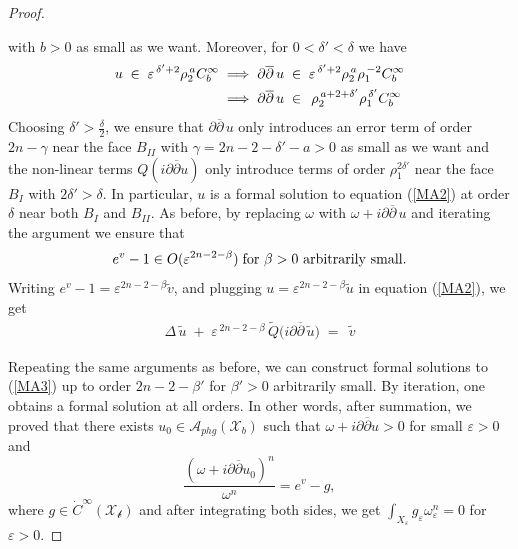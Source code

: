 \documentclass[a4paper,11pt]{article}
\begin{document}
\begin{proof}
\begin{itemize}
with $b>0$ as small as we want.  Moreover, for $0<\delta' < \delta$ we have 
\begin{align*}
u \;\in\; \varepsilon^{\,\delta'+2} \rho_{2}^{\,a} C_{b}^{\infty} 
\hspace{0.1cm} & \Longrightarrow\hspace{0.1cm}
\partial\overline{\partial}\,u
\;\in\;
\varepsilon^{\,\delta'+2}\rho_{2}^{\,a}\rho_{1}^{\,-2} C_{b}^{\infty}\\
& \Longrightarrow\hspace{0.1cm}
\partial\overline{\partial}\,u
\;\in\;
\,\rho_{2}^{\,a +2 + \delta'} \rho_{1}^{\,\delta'} C_{b}^{\infty}
\end{align*}
Choosing $\delta' > \frac{\delta}{2}$, we ensure that $\partial\overline{\partial}\,u$ only introduces an error term of order $2n - \gamma$ near the face $B_{II}$ with $\gamma = 2n-2-\delta' - a > 0$ as small as we want and the non-linear terms $Q(i \partial \overline{\partial} u)$ only introduce terms of order $\rho_1^{2 \delta'}$ near the face $B_{I}$ with $2 \delta' > \delta$. In particular, $u$ is a formal solution to equation (\ref{MA2}) at order $\delta$ near both $B_{I}$ and $B_{II}$. As before, by replacing $\omega$ with $\omega + i \partial\overline{\partial}\,u $ and iterating the argument we ensure that 
$$
e^v -1 \in O(\varepsilon ^{2n - 2 - \beta}) \hspace{0.1cm} \text{for $\beta >0$ arbitrarily small.}
$$ 
Writing $e^v -1 = \varepsilon ^{2n - 2 - \beta} \tilde{v}$, and plugging $u = \varepsilon ^{2n - 2 - \beta} \tilde{u}$ in equation (\ref{MA2}), we get 
\begin{align}\label{MA3}
\Delta \,\widetilde{u} \;+\;\varepsilon^{\,2n-2-\beta}\, \tilde Q\bigl( i\partial\overline{\partial}\,\widetilde{u}\bigr)
\;=\;
\,\widetilde{v} 
\end{align}
   \end{itemize}
Repeating the same arguments as before, we can construct formal solutions to (\ref{MA3}) up to order $2n - 2 - \beta' $ for $\beta'>0$ arbitrarily small. By iteration, one obtains a formal solution at all orders. In other words, after summation, we proved that there exists $u_0 \in \mathcal{A}_{phg}(\mathcal{X}_b)$ such that $\omega + i \partial \overline{\partial}u >0$ for small $\varepsilon >0$ and 
$$
\frac{(\omega + i \partial \overline{\partial} u_0)^n}{\omega^n} = e^v - g, 
$$
where $g \in \dot{C}^\infty(\mathcal{X_b})$ and after integrating both sides, we get $\int_{X_\varepsilon} g_\varepsilon \omega_\varepsilon^n= 0$ for $\varepsilon>0$.

\end{proof}
\end{document}
